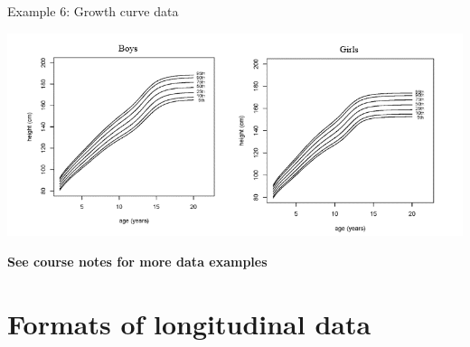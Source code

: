 \documentclass[
  9pt,
  ignorenonframetext,
]{beamer}
\begin{document}
\begin{frame}{}
\protect\hypertarget{section-7}{}
\begin{block}{Example 6: Growth curve data}
\protect\hypertarget{example-6-growth-curve-data-1}{}
\tiny

\begin{center}\includegraphics[width=1\linewidth]{figs_L1/L1-f2} \end{center}

\tiny

\textbf{See course notes for more data examples}
\end{block}
\end{frame}

\hypertarget{formats-of-longitudinal-data}{%
\section{Formats of longitudinal
data}\label{formats-of-longitudinal-data}}
\end{document}
